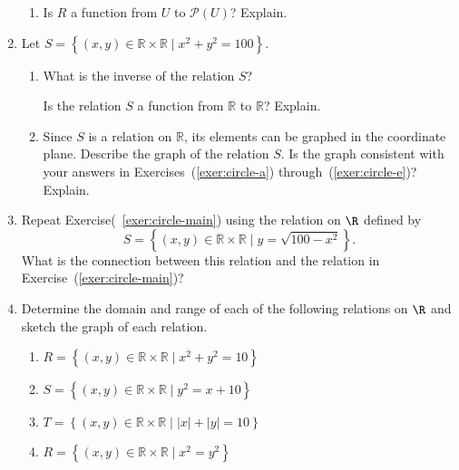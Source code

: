 \begin{enumerate}
\begin{enumerate}
  \item Is  $R$  a function from  $U$  to  $\mathcal{P}( U )$?  Explain.
\end{enumerate}

\item Let  
$S = \left\{ {\left( {x, y} \right) \in \mathbb{R} \times \mathbb{R} \mid x^2  + y^2  = 100} \right\}$. \label{exer:circle-main} %

\begin{enumerate}
  \yitem Determine the set of all values of  $x$  such that  $\left( {x, 6} \right) \in S$, and determine the set of all values of $x$  such that  $\left( {x, 9} \right) \in S$\!. 
\label{exer:circle-a}

  \yitem Determine the domain and range of the relation  $S$ and write each set using set builder notation.  

  \item What is the inverse of the relation  $S$?

  \yitem Is the relation  $S$  a function from  $\mathbb{R}$ to  $\mathbb{R}$?  Explain.                  \label{exer:circle-e}

  \item Since  $S$ is a relation on  $\mathbb{R}$, its elements can be graphed in the coordinate         plane.  Describe the graph of the relation  $S$. Is the graph consistent with your answers in Exercises~(\ref{exer:circle-a}) through~(\ref{exer:circle-e})?  Explain.
\end{enumerate}

\item Repeat Exercise(~\ref{exer:circle-main}) using the relation on $\R$ defined by
\[
S = \left\{ {\left( {x, y} \right) \in \mathbb{R} \times \mathbb{R}   \mid y = \sqrt {100 - x^2 } } \right\}\!.\]
What is the connection between this relation and the relation in Exercise~(\ref{exer:circle-main})? \label{exer:semicircle}

\item Determine the domain and range of each of the following relations on $\R$ and sketch the graph of each relation.
\begin{enumerate}
\item $R = \left\{ {\left( {x, y} \right) \in \mathbb{R} \times \mathbb{R} \mid x^2  + y^2  = 10} \right\}$
\item $S = \left\{ {\left( {x, y} \right) \in \mathbb{R} \times \mathbb{R} \mid y^2  = x+10} \right\}$
\item $T = \left\{ {\left( {x, y} \right) \in \mathbb{R} \times \mathbb{R} \mid |x| + |y| = 10} \right\}$
\item $R = \left\{ {\left( {x, y} \right) \in \mathbb{R} \times \mathbb{R} \mid x^2  =y^2} \right\}$
\end{enumerate}



\end{enumerate}
